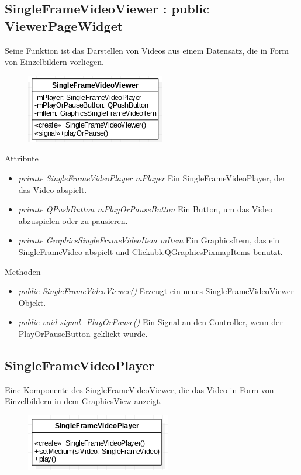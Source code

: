 \subsection*{SingleFrameVideoViewer : public ViewerPageWidget}
Seine Funktion ist das Darstellen von Videos aus einem Datensatz, die in Form von Einzelbildern vorliegen.

\begin{figure}[H]
	\centering
	\includegraphics[scale=0.5]{img/Klassendiagramm/Klassen/View/SingleFrameVideoViewer}
	\label{fig:singleFrameVideoViewer}
\end{figure}

Attribute
\begin{itemize}
	\item\textit{private SingleFrameVideoPlayer mPlayer} 
	Ein SingleFrameVideoPlayer, der das Video abspielt. 
	\item\textit{private QPushButton mPlayOrPauseButton} 
	Ein Button, um das Video abzuspielen oder zu pausieren.
	\item\textit{private GraphicsSingleFrameVideoItem mItem} 
	Ein GraphicsItem, das ein SingleFrameVideo abspielt und ClickableQGraphicsPixmapItems benutzt.
\end{itemize}

Methoden
\begin{itemize}
	\item\textit{public SingleFrameVideoViewer()} 
	Erzeugt ein neues SingleFrameVideoViewer-Objekt.
	\item\textit{public void signal\_PlayOrPause()} 
	Ein Signal an den Controller, wenn der PlayOrPauseButton geklickt wurde.
\end{itemize} 

\subsection*{SingleFrameVideoPlayer} 
Eine Komponente des SingleFrameVideoViewer, die das Video in Form von Einzelbildern in dem GraphicsView anzeigt.

\begin{figure}[H]
	\centering
	\includegraphics[scale=0.5]{img/Klassendiagramm/Klassen/View/SingleFrameVideoPlayer}
	\label{fig:singleFrameVideoPlayer}
\end{figure}

